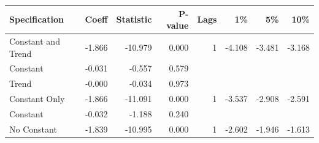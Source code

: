 \begin{table}[htbp]
\centering
{}
\label{tab:adf_co2}
\small
\begin{tabular}{lrrrrrrr}
\toprule
\textbf{Specification} & \textbf{Coeff} & \textbf{Statistic} & \textbf{P-value} & \textbf{Lags} & \textbf{1\%} & \textbf{5\%} & \textbf{10\%} \\
\midrule
Constant and Trend & -1.866 & -10.979 & 0.000 & 1 & -4.108 & -3.481 & -3.168 \\
\quad Constant & -0.031 & -0.557 & 0.579 & & & & \\
\quad Trend & -0.000 & -0.034 & 0.973 & & & & \\
Constant Only & -1.866 & -11.091 & 0.000 & 1 & -3.537 & -2.908 & -2.591 \\
\quad Constant & -0.032 & -1.188 & 0.240 & & & & \\
No Constant & -1.839 & -10.995 & 0.000 & 1 & -2.602 & -1.946 & -1.613 \\
\bottomrule
\end{tabular}
\end{table}
